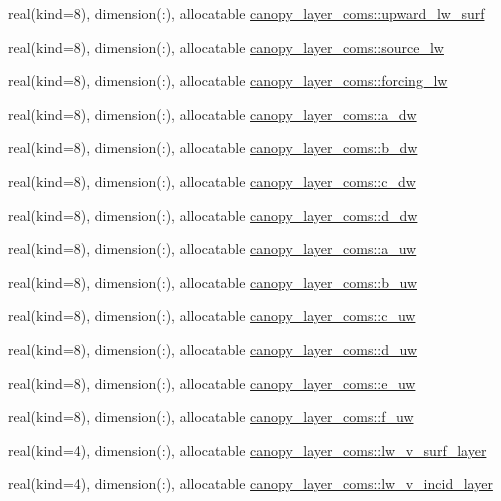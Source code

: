 \begin{DoxyCompactItemize}
real(kind=8), dimension(\+:), allocatable \hyperlink{namespacecanopy__layer__coms_ac46ee0cea4394729b21467637ff807d8}{canopy\+\_\+layer\+\_\+coms\+::upward\+\_\+lw\+\_\+surf}
\item 
real(kind=8), dimension(\+:), allocatable \hyperlink{namespacecanopy__layer__coms_acab9a0d2987be1eb3adf62b284d514f8}{canopy\+\_\+layer\+\_\+coms\+::source\+\_\+lw}
\item 
real(kind=8), dimension(\+:), allocatable \hyperlink{namespacecanopy__layer__coms_a456a3cd6ca31152aa6e000baf9ab668c}{canopy\+\_\+layer\+\_\+coms\+::forcing\+\_\+lw}
\item 
real(kind=8), dimension(\+:), allocatable \hyperlink{namespacecanopy__layer__coms_a2584d733078541cc3c82911c5178a352}{canopy\+\_\+layer\+\_\+coms\+::a\+\_\+dw}
\item 
real(kind=8), dimension(\+:), allocatable \hyperlink{namespacecanopy__layer__coms_a4a34e13a815b0c72c3ac6ab0e4cc3c42}{canopy\+\_\+layer\+\_\+coms\+::b\+\_\+dw}
\item 
real(kind=8), dimension(\+:), allocatable \hyperlink{namespacecanopy__layer__coms_ad0bcaad69c487152e827bca2f683297b}{canopy\+\_\+layer\+\_\+coms\+::c\+\_\+dw}
\item 
real(kind=8), dimension(\+:), allocatable \hyperlink{namespacecanopy__layer__coms_a59c98ff7aadc5fec828a1325cf3d05ba}{canopy\+\_\+layer\+\_\+coms\+::d\+\_\+dw}
\item 
real(kind=8), dimension(\+:), allocatable \hyperlink{namespacecanopy__layer__coms_a0aee7af32fcb60ed8f8935d4d74ea9db}{canopy\+\_\+layer\+\_\+coms\+::a\+\_\+uw}
\item 
real(kind=8), dimension(\+:), allocatable \hyperlink{namespacecanopy__layer__coms_ace887e140ffc0ef5ba218f09ce5dd6db}{canopy\+\_\+layer\+\_\+coms\+::b\+\_\+uw}
\item 
real(kind=8), dimension(\+:), allocatable \hyperlink{namespacecanopy__layer__coms_adb9b19c4fae670208f123d80f3913252}{canopy\+\_\+layer\+\_\+coms\+::c\+\_\+uw}
\item 
real(kind=8), dimension(\+:), allocatable \hyperlink{namespacecanopy__layer__coms_ab3513d3090f9936bbf406d57ff8dcd29}{canopy\+\_\+layer\+\_\+coms\+::d\+\_\+uw}
\item 
real(kind=8), dimension(\+:), allocatable \hyperlink{namespacecanopy__layer__coms_aa70ec83b3221ee7aee0beedb704c2b9f}{canopy\+\_\+layer\+\_\+coms\+::e\+\_\+uw}
\item 
real(kind=8), dimension(\+:), allocatable \hyperlink{namespacecanopy__layer__coms_ac42fff0528a6772261cedc0d1ddf51ed}{canopy\+\_\+layer\+\_\+coms\+::f\+\_\+uw}
\item 
real(kind=4), dimension(\+:), allocatable \hyperlink{namespacecanopy__layer__coms_afc08d9f0b2aac2484cb5ec912eaaa1c2}{canopy\+\_\+layer\+\_\+coms\+::lw\+\_\+v\+\_\+surf\+\_\+layer}
\item 
real(kind=4), dimension(\+:), allocatable \hyperlink{namespacecanopy__layer__coms_afc304625420857d7ec564e4598123446}{canopy\+\_\+layer\+\_\+coms\+::lw\+\_\+v\+\_\+incid\+\_\+layer}
\end{DoxyCompactItemize}
